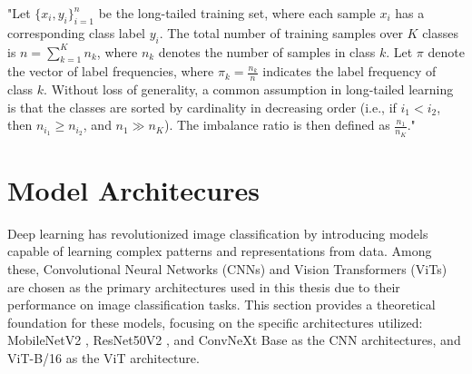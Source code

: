 "Let $\{x_i, y_i\}_{i=1}^n$ be the long-tailed training set, where each sample $x_i$ has a corresponding class label $y_i$. The total number of training samples over $K$ classes is $n = \sum_{k=1}^K n_k$, where $n_k$ denotes the number of samples in class $k$. Let $\pi$ denote the vector of label frequencies, where $\pi_k = \frac{n_k}{n}$ indicates the label frequency of class $k$. Without loss of generality, a common assumption in long-tailed learning \cite{31, 32} is that the classes are sorted by cardinality in decreasing order (i.e., if $i_1 < i_2$, then $n_{i_1} \geq n_{i_2}$, and $n_1 \gg n_K$). The imbalance ratio is then defined as $\frac{n_1}{n_K}$." \cite{zhang2023deep}



\section{Model Architecures}
\label{sec:model_arch}
Deep learning has revolutionized image classification by introducing models capable of learning complex patterns and representations from data. Among these, Convolutional Neural Networks (CNNs) and Vision Transformers (ViTs) are chosen as the primary architectures used in this thesis due to their performance on image classification tasks. This section provides a theoretical foundation for these models, focusing on the specific architectures utilized: MobileNetV2 \cite{sandler2018mobilenetv2}, ResNet50V2 \cite{he2016}, and ConvNeXt Base \cite{todi2023convnext} as the CNN architectures, and ViT-B/16 \cite{dosovitskiy2021imageworth16x16words} as the ViT architecture.



